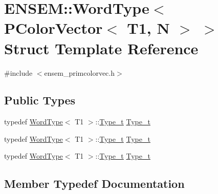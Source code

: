 \hypertarget{structENSEM_1_1WordType_3_01PColorVector_3_01T1_00_01N_01_4_01_4}{}\section{E\+N\+S\+EM\+:\+:Word\+Type$<$ P\+Color\+Vector$<$ T1, N $>$ $>$ Struct Template Reference}
\label{structENSEM_1_1WordType_3_01PColorVector_3_01T1_00_01N_01_4_01_4}


{\ttfamily \#include $<$ensem\+\_\+primcolorvec.\+h$>$}

\subsection*{Public Types}
\begin{DoxyCompactItemize}
\item 
typedef \mbox{\hyperlink{structENSEM_1_1WordType}{Word\+Type}}$<$ T1 $>$\+::\mbox{\hyperlink{structENSEM_1_1WordType_3_01PColorVector_3_01T1_00_01N_01_4_01_4_a86e73ce3277cd28d9e0550e1989ad245}{Type\+\_\+t}} \mbox{\hyperlink{structENSEM_1_1WordType_3_01PColorVector_3_01T1_00_01N_01_4_01_4_a86e73ce3277cd28d9e0550e1989ad245}{Type\+\_\+t}}
\item 
typedef \mbox{\hyperlink{structENSEM_1_1WordType}{Word\+Type}}$<$ T1 $>$\+::\mbox{\hyperlink{structENSEM_1_1WordType_3_01PColorVector_3_01T1_00_01N_01_4_01_4_a86e73ce3277cd28d9e0550e1989ad245}{Type\+\_\+t}} \mbox{\hyperlink{structENSEM_1_1WordType_3_01PColorVector_3_01T1_00_01N_01_4_01_4_a86e73ce3277cd28d9e0550e1989ad245}{Type\+\_\+t}}
\item 
typedef \mbox{\hyperlink{structENSEM_1_1WordType}{Word\+Type}}$<$ T1 $>$\+::\mbox{\hyperlink{structENSEM_1_1WordType_3_01PColorVector_3_01T1_00_01N_01_4_01_4_a86e73ce3277cd28d9e0550e1989ad245}{Type\+\_\+t}} \mbox{\hyperlink{structENSEM_1_1WordType_3_01PColorVector_3_01T1_00_01N_01_4_01_4_a86e73ce3277cd28d9e0550e1989ad245}{Type\+\_\+t}}
\end{DoxyCompactItemize}


\subsection{Member Typedef Documentation}
\mbox{\label{structENSEM_1_1WordType_3_01PColorVector_3_01T1_00_01N_01_4_01_4_a86e73ce3277cd28d9e0550e1989ad245}} 
